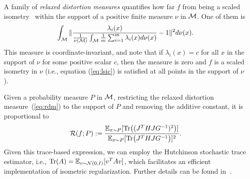 A family of {\it relaxed distortion measures} quantifies how far $f$ from being a scaled isometry~\cite{yonghyeon2022regularized} within the support of a positive finite measure $\nu$ in ${\cal M}$. One of them is
\begin{equation}
\label{eq:rdm}
    \int_{\cal M} \|\frac{\lambda_i(x)}{\frac{1}{\nu({\cal M})}\int_{\cal M} \frac{1}{m}\sum_{i=1}^{m} \lambda_i(x) d\nu(x)} - 1\|^2 d\nu(x).
\end{equation}
This measure is coordinate-invariant, and note that if $\lambda_i(x)=c$ for all $x$ in the support of $\nu$ for some positive scalar $c$, then the measure is zero and $f$ is a scaled isometry in $\nu$ (i.e., equation (\ref{eq:lsic}) is satisfied at all points in the support of $\nu$). 

Given a probability measure $P$ in ${\cal M}$, restricting the relaxed distortion measure~(\ref{eq:rdm}) to the support of $P$ and removing the additive constant, it is proportional to 
\begin{equation}
\label{eq:rdmff}
    {\cal R}(f; P):=\frac{\mathbb{E}_{x \sim P} [{\rm Tr} \big((J^THJG^{-1})^2\big)]}{\mathbb{E}_{x\sim P}[{\rm Tr}\big(J^THJG^{-1}\big)]^2}.
\end{equation}
Given this trace-based expression, we can employ the Hutchinson stochastic trace estimator, i.e., $\text{Tr}(A) = \mathbb{E}_{v\sim {\cal N}(0, I)}[v^T A v]$, which facilitates an efficient implementation of isometric regularization. Further details can be found in~\cite{lee2023equivariant,lee2023geometric}.